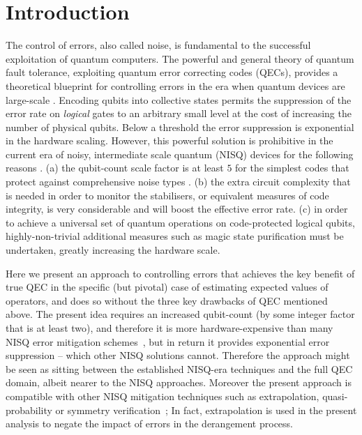 \documentclass[aps,prx,showpacs,twocolumn,reprint]{revtex4-2}
\begin{document}
\maketitle


\section{Introduction}

The control of errors, also called noise, is fundamental to the successful
exploitation of quantum computers. The powerful and general theory of quantum
fault tolerance, exploiting quantum error correcting codes (QECs), provides a
theoretical blueprint for controlling errors in the era when quantum
devices are  large-scale \cite{nielsenChuang, lidar2013quantum, PhysRevA.57.127,PhysRevA.52.R2493, PhysRevA.54.1098,knill1998resilient,10.1145/258533.258579}.
Encoding qubits into collective states permits the suppression of the error rate
on {\it logical} gates to an arbitrary small level at the cost of increasing the number
of physical qubits.
Below a threshold the error suppression is exponential in the hardware scaling. However, this powerful solution is prohibitive in the current era of noisy, intermediate scale quantum (NISQ) devices for the following reasons \cite{preskill2018quantum}. (a) the qubit-count scale factor is at least $5$
for the simplest codes that protect against comprehensive noise types \cite{PhysRevLett.77.198, PhysRevA.54.3824}.
(b) the extra circuit complexity that is needed in order to monitor the stabilisers, or equivalent measures of code integrity, is very considerable and will boost the effective error rate.
(c) in order to achieve a universal set of quantum operations on code-protected logical qubits, highly-non-trivial additional measures such as magic state purification must be undertaken, greatly increasing the hardware scale. 

Here we present an approach to controlling errors that achieves the key benefit of true QEC in the specific (but pivotal) case of estimating expected values of operators, and does so without the three key drawbacks of QEC mentioned above.
The present idea requires an increased qubit-count (by some integer factor that is at least two),
and therefore it is more hardware-expensive than many NISQ error mitigation schemes~\cite{cerezo2020variationalreview, endo2020hybrid,bharti2021noisy,Li2017,PhysRevX.8.031027, kandala2018extending,PhysRevLett.119.180509, strikis2020learning, czarnik2020error, PhysRevLett.122.180501, rattew2020quantum}, but in return it provides exponential
error suppression -- which other NISQ solutions cannot.
Therefore the approach might be seen as sitting between the established NISQ-era techniques and the
full QEC domain, albeit nearer to the NISQ approaches.
Moreover the present approach is compatible with other NISQ mitigation techniques such as extrapolation, quasi-probability or symmetry
verification~\cite{endo2020hybrid,Li2017,PhysRevX.8.031027, kandala2018extending,PhysRevLett.119.180509, strikis2020learning, czarnik2020error, PhysRevLett.122.180501};
In fact, extrapolation is used in the present analysis to negate the impact of errors in the derangement process. 
\end{document}
